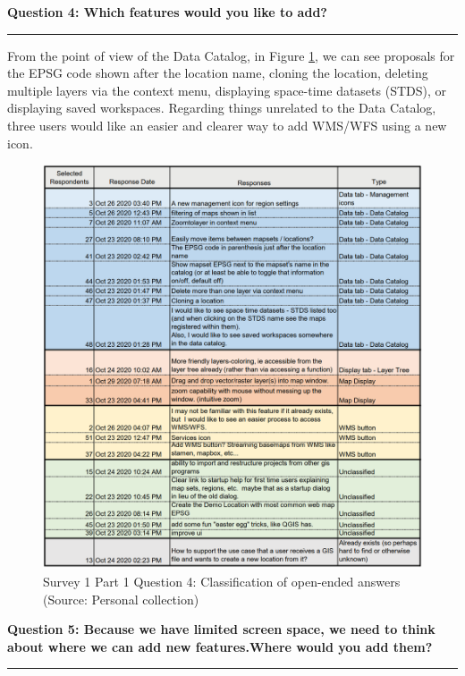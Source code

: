 \documentclass[a4paper,10pt,twoside]{article}
\begin{document}
\newpage
\noindent \textbf{Question 4: Which features would you like to add?}
\par\noindent\rule{\textwidth}{0.4pt}

\noindent From the point of view of the Data Catalog, in Figure \ref{fig:survey1_part1_question4_open_ended}, we can see proposals for the EPSG code shown after the location name, cloning the location, deleting multiple layers via the context menu, displaying space-time datasets (STDS), or displaying saved workspaces. Regarding things unrelated to the Data Catalog, three users would like an easier and clearer way to add WMS/WFS using a new icon.

\begin{figure}[hbt!] 
\begin{center}
\includegraphics[width=15.5cm]{../surveys/analyzed_data/survey1_part1_question4_open_ended.png} 
\caption[Survey 1 Part 1 Question 4: Classification of open-ended answers]{Survey 1 Part 1 Question 4: Classification of open-ended answers (Source: Personal collection)}
\label{fig:survey1_part1_question4_open_ended}
\end{center}
\end{figure}

\newpage
\noindent \textbf{Question 5: Because we have limited screen space, we need to think about where we can add new features.Where would you add them?}
\par\noindent\rule{\textwidth}{0.4pt}
\end{document}
